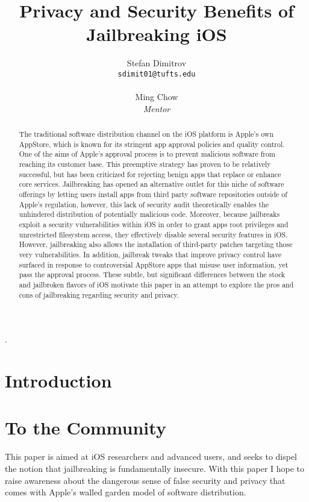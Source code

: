 \documentclass[12pt, titlepage, oneside]{article}
\title{Privacy and Security Benefits of Jailbreaking iOS}
\author{
  Stefan Dimitrov\\
  \texttt{sdimit01@tufts.edu}
  \\\\
  Ming Chow\\
  \emph{Mentor}
}
\begin{document}
\maketitle

\begin{abstract}

The traditional software distribution channel on the iOS platform is Apple's own AppStore, which is known for its stringent app approval policies and quality control. One of the aims of Apple's approval process is to prevent malicious software from reaching its customer base. This preemptive strategy has proven to be relatively successful, but has been criticized for rejecting benign apps that replace or enhance core services. Jailbreaking has opened an alternative outlet for this niche of software offerings by letting users install apps from third party software repositories outside of Apple's regulation, however, this lack of security audit theoretically enables the unhindered distribution of potentially malicious code. Moreover, because jailbreaks exploit a security vulnerabilities within iOS in order to grant apps root privileges and unrestricted filesystem access, they effectively disable several security features in iOS. However, jailbreaking also allows the installation of third-party patches targeting those very vulnerabilities. In addition, jailbreak tweaks that improve privacy control have surfaced in response to controversial AppStore apps that misuse user information, yet pass the approval process. These subtle, but significant differences between the stock and jailbroken flavors of iOS motivate this paper in an attempt to explore the pros and cons of jailbreaking regarding security and privacy.

\end{abstract}.



\tableofcontents

\pagebreak
\doublespacing

\section{Introduction}

\section{To the Community}
This paper is aimed at iOS researchers and advanced users, and seeks to dispel the notion that jailbreaking is fundamentally insecure. With this paper I hope to raise awareness about the dangerous sense of false security and privacy that comes with Apple's walled garden model of software distribution. 
\end{document}
